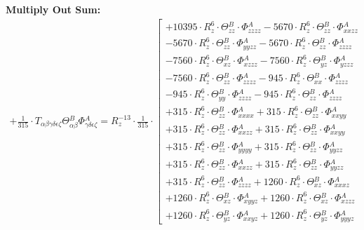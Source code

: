 \documentclass{article}
\begin{document}
\textbf{Multiply Out Sum:}
\begin{subequations}\begin{gather}
+ \frac{1}{315} \cdot T_{\alpha{}\beta{}\gamma{}\delta{}\epsilon{}\zeta{}} \Theta{}^{B}_{\alpha{}\beta{}} \Phi{}^{A}_{\gamma{}\delta{}\epsilon{}\zeta{}} = R_{z}^{-13} \cdot \frac{1}{315} \cdot  \left[ \begin{array}{c} 
 		+ 10395 \cdot R_{z}^{6} \cdot \Theta{}^{B}_{zz} \cdot \Phi{}^{A}_{zzzz}- 5670 \cdot R_{z}^{6} \cdot \Theta{}^{B}_{zz} \cdot \Phi{}^{A}_{xxzz} 
 \\[0.2em] 		 - 5670 \cdot R_{z}^{6} \cdot \Theta{}^{B}_{zz} \cdot \Phi{}^{A}_{yyzz}- 5670 \cdot R_{z}^{6} \cdot \Theta{}^{B}_{zz} \cdot \Phi{}^{A}_{zzzz} 
 \\[0.2em] 		 - 7560 \cdot R_{z}^{6} \cdot \Theta{}^{B}_{xz} \cdot \Phi{}^{A}_{xzzz}- 7560 \cdot R_{z}^{6} \cdot \Theta{}^{B}_{yz} \cdot \Phi{}^{A}_{yzzz} 
 \\[0.2em] 		 - 7560 \cdot R_{z}^{6} \cdot \Theta{}^{B}_{zz} \cdot \Phi{}^{A}_{zzzz}- 945 \cdot R_{z}^{6} \cdot \Theta{}^{B}_{xx} \cdot \Phi{}^{A}_{zzzz} 
 \\[0.2em] 		 - 945 \cdot R_{z}^{6} \cdot \Theta{}^{B}_{yy} \cdot \Phi{}^{A}_{zzzz}- 945 \cdot R_{z}^{6} \cdot \Theta{}^{B}_{zz} \cdot \Phi{}^{A}_{zzzz} 
 \\[0.2em] 		 + 315 \cdot R_{z}^{6} \cdot \Theta{}^{B}_{zz} \cdot \Phi{}^{A}_{xxxx}+ 315 \cdot R_{z}^{6} \cdot \Theta{}^{B}_{zz} \cdot \Phi{}^{A}_{xxyy} 
 \\[0.2em] 		 + 315 \cdot R_{z}^{6} \cdot \Theta{}^{B}_{zz} \cdot \Phi{}^{A}_{xxzz}+ 315 \cdot R_{z}^{6} \cdot \Theta{}^{B}_{zz} \cdot \Phi{}^{A}_{xxyy} 
 \\[0.2em] 		 + 315 \cdot R_{z}^{6} \cdot \Theta{}^{B}_{zz} \cdot \Phi{}^{A}_{yyyy}+ 315 \cdot R_{z}^{6} \cdot \Theta{}^{B}_{zz} \cdot \Phi{}^{A}_{yyzz} 
 \\[0.2em] 		 + 315 \cdot R_{z}^{6} \cdot \Theta{}^{B}_{zz} \cdot \Phi{}^{A}_{xxzz}+ 315 \cdot R_{z}^{6} \cdot \Theta{}^{B}_{zz} \cdot \Phi{}^{A}_{yyzz} 
 \\[0.2em] 		 + 315 \cdot R_{z}^{6} \cdot \Theta{}^{B}_{zz} \cdot \Phi{}^{A}_{zzzz}+ 1260 \cdot R_{z}^{6} \cdot \Theta{}^{B}_{xz} \cdot \Phi{}^{A}_{xxxz} 
 \\[0.2em] 		 + 1260 \cdot R_{z}^{6} \cdot \Theta{}^{B}_{xz} \cdot \Phi{}^{A}_{xyyz}+ 1260 \cdot R_{z}^{6} \cdot \Theta{}^{B}_{xz} \cdot \Phi{}^{A}_{xzzz} 
 \\[0.2em] 		 + 1260 \cdot R_{z}^{6} \cdot \Theta{}^{B}_{yz} \cdot \Phi{}^{A}_{xxyz}+ 1260 \cdot R_{z}^{6} \cdot \Theta{}^{B}_{yz} \cdot \Phi{}^{A}_{yyyz} 

\end{array}
\end{gather}
\end{subequations}
\end{document}
